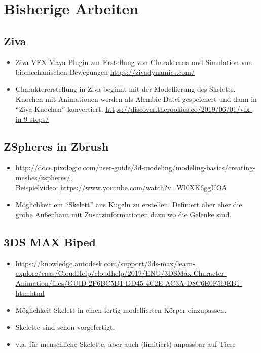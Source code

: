 \chapter{Bisherige Arbeiten}

\section{Ziva}

\begin{itemize}
 \item Ziva VFX Maya Plugin zur Erstellung von Charakteren und Simulation von biomechanischen Bewegungen \url{https://zivadynamics.com/}
 \item Charaktererstellung in Ziva beginnt mit der Modellierung des Skeletts. Knochen mit Animationen werden als Alembic-Datei gespeichert und dann in "`Ziva-Knochen"' konvertiert. \url{https://discover.therookies.co/2019/06/01/vfx-in-9-steps/}
\end{itemize}

\section{ZSpheres in Zbrush}

\begin{itemize}
 \item \url{http://docs.pixologic.com/user-guide/3d-modeling/modeling-basics/creating-meshes/zspheres/},\\ Beispielvideo: \url{https://www.youtube.com/watch?v=Wl0XK6ggUOA}
 \item Möglichkeit ein "`Skelett"' aus Kugeln zu erstellen. Definiert aber eher die grobe Außenhaut mit Zusatzinformationen dazu wo die Gelenke sind.
\end{itemize}

\section{3DS MAX Biped}

\begin{itemize}
 \item \url{https://knowledge.autodesk.com/support/3ds-max/learn-explore/caas/CloudHelp/cloudhelp/2019/ENU/3DSMax-Character-Animation/files/GUID-2F6BC5D1-DD45-4C2E-AC3A-D8C6E0F5DEB1-htm.html}
 \item Möglichkeit Skelett in einen fertig modellierten Körper einzupassen. 
 \item Skelette sind schon vorgefertigt.
 \item v.a. für menschliche Skelette, aber auch (limitiert) anpassbar auf Tiere
\end{itemize}


